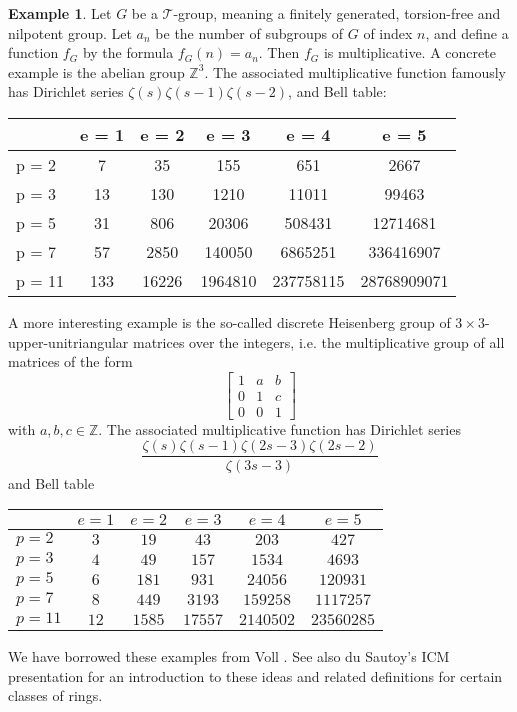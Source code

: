 \documentclass[a4paper]{article}
\theoremstyle{definition}
\newtheorem{example}{Example}[section]
\theoremstyle{remark}
\begin{document}
\begin{example}
Let $G$ be a $\mathcal{T}$-group, meaning a finitely generated, torsion-free and nilpotent group. Let $a_n$ be the number of subgroups of $G$ of index $n$, and define a function $f_G$ by the formula $f_G(n) = a_n$. Then $f_G$ is multiplicative. A concrete example is the abelian group $\mathbb{Z}^3$. The associated multiplicative function famously has Dirichlet series $\zeta(s) \zeta(s-1) \zeta(s-2)$, and Bell table:
\vskip10pt
\begin{center}
\begin{tabular}{| l | | c | c | c | c | c |}
\hline
& e = 1 & e = 2 & e = 3 & e = 4 & e = 5\\
\hline
\hline
p = 2 & 7 & 35 & 155 & 651 & 2667 \\
\hline
p = 3 & 13 & 130 & 1210 & 11011 & 99463 \\
\hline
p = 5 & 31 & 806 & 20306 & 508431 & 12714681 \\
\hline
p = 7 & 57 & 2850 & 140050 & 6865251 & 336416907 \\
\hline
p = 11 & 133 & 16226 & 1964810 & 237758115 & 28768909071 \\
\hline
\end{tabular}
\end{center}
A more interesting example is the so-called discrete Heisenberg group of $3 \times 3$-upper-unitriangular matrices over the integers, i.e. the multiplicative group of all matrices of the form
$$
\begin{bmatrix}
    1       & a & b  \\
    0       & 1 & c  \\
     0      & 0 & 1  
\end{bmatrix}
$$
with $a, b, c \in \mathbb{Z}$. The associated multiplicative function has Dirichlet series
$$ \frac{\zeta(s) \zeta(s-1) \zeta(2s-3) \zeta(2s-2) }{\zeta(3s-3)} $$
and Bell table 
\vskip10pt
\begin{center}
\begin{tabular}{| l | | c | c | c | c | c |}
\hline
& $e = 1$ & $e = 2$ & $e = 3$ & $e = 4$ & $e = 5$\\
\hline
\hline
$p = 2$ & $3$ & $19$ & $43$ & $203$ & $427$ \\
\hline
$p = 3$ & $4$ & $49$ & $157$ & $1534$ & $4693$ \\
\hline
$p = 5$ & $6$ & $181$ & $931$ & $24056$ & $120931$ \\
\hline
$p = 7$ & $8$ & $449$ & $3193$ & $159258$ & $1117257$ \\
\hline
$p = 11$ & $12$ & $1585$ & $17557$ & $2140502$ & $23560285$ \\
\hline
\end{tabular}
\end{center}
We have borrowed these examples from Voll \cite{VollIntro}. See also du Sautoy's ICM presentation \cite{duSautoyICM} for an introduction to these ideas and related definitions for certain classes of rings.
\end{example}
\end{document}
